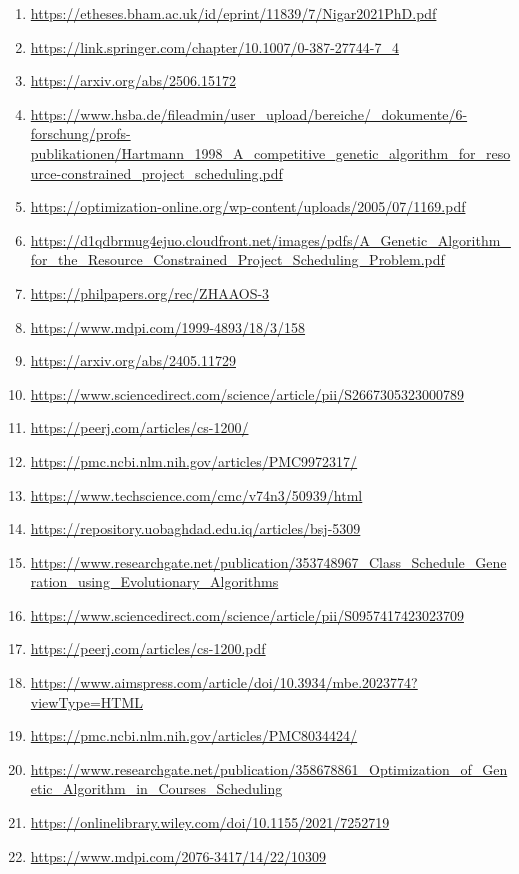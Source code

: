 \documentclass[a4paper,12pt]{article}
\begin{document}
\begin{enumerate}
  \item \url{https://etheses.bham.ac.uk/id/eprint/11839/7/Nigar2021PhD.pdf}
  \item \url{https://link.springer.com/chapter/10.1007/0-387-27744-7_4}
  \item \url{https://arxiv.org/abs/2506.15172}
  \item \url{https://www.hsba.de/fileadmin/user_upload/bereiche/_dokumente/6-forschung/profs-publikationen/Hartmann_1998_A_competitive_genetic_algorithm_for_resource-constrained_project_scheduling.pdf}
  \item \url{https://optimization-online.org/wp-content/uploads/2005/07/1169.pdf}
  \item \url{https://d1qdbrmug4ejuo.cloudfront.net/images/pdfs/A_Genetic_Algorithm_for_the_Resource_Constrained_Project_Scheduling_Problem.pdf}
  \item \url{https://philpapers.org/rec/ZHAAOS-3}
  \item \url{https://www.mdpi.com/1999-4893/18/3/158}
  \item \url{https://arxiv.org/abs/2405.11729}
  \item \url{https://www.sciencedirect.com/science/article/pii/S2667305323000789}
  \item \url{https://peerj.com/articles/cs-1200/}
  \item \url{https://pmc.ncbi.nlm.nih.gov/articles/PMC9972317/}
  \item \url{https://www.techscience.com/cmc/v74n3/50939/html}
  \item \url{https://repository.uobaghdad.edu.iq/articles/bsj-5309}
  \item \url{https://www.researchgate.net/publication/353748967_Class_Schedule_Generation_using_Evolutionary_Algorithms}
  \item \url{https://www.sciencedirect.com/science/article/pii/S0957417423023709}
  \item \url{https://peerj.com/articles/cs-1200.pdf}
  \item \url{https://www.aimspress.com/article/doi/10.3934/mbe.2023774?viewType=HTML}
  \item \url{https://pmc.ncbi.nlm.nih.gov/articles/PMC8034424/}
  \item \url{https://www.researchgate.net/publication/358678861_Optimization_of_Genetic_Algorithm_in_Courses_Scheduling}
  \item \url{https://onlinelibrary.wiley.com/doi/10.1155/2021/7252719}
  \item \url{https://www.mdpi.com/2076-3417/14/22/10309}

\end{enumerate}
\end{document}

